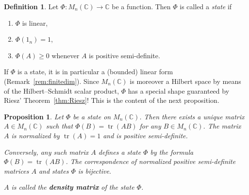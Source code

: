 \documentclass[11pt,a4paper]{article}
\numberwithin{equation}{section}
\newcommand{\C}{\mathbb{C}}
\DeclareMathOperator{\tr}{tr}
\theoremstyle{plain}
\newtheorem{proposition}[theorem]{Proposition}
\theoremstyle{definition}
\newtheorem{definition}[theorem]{Definition}
\theoremstyle{plain}
\theoremstyle{definition}
\begin{document}
\begin{definition}
Let $\Phi:M_n(\C)\to\C$ be a function. Then $\Phi$ is called a \emph{state} if
\begin{enumerate}
\item $\Phi$ is linear,
\item $\Phi(1_n)=1$,
\item $\Phi(A)\geqslant0$ whenever $A$ is positive semi-definite.
\end{enumerate}
\end{definition}

If $\Phi$ is a state, it is in particular a (bounded) linear form (Remark~\ref{rem:finitedim}).
Since $M_n(\C)$ is moreover a Hilbert space by means of the Hilbert--Schmidt scalar product,
$\Phi$ has a special shape guaranteed by Riesz' Theorem~\ref{thm:Riesz}! This is the content
of the next proposition.

\begin{proposition}\label{prop:density}
Let $\Phi$ be a state on $M_n(\C)$. Then there exists a unique matrix $A\in M_n(\C)$ such
that $\Phi(B)=\tr(AB)$ for any $B\in M_n(\C)$. The matrix $A$ is normalized by $\tr(A)=1$
and is positive semi-definite.

Conversely, any such matrix $A$ defines a state $\Phi$ by the formula $\Phi(B)=\tr(AB)$. The
correspondence of normalized positive semi-definite matrices $A$ and states $\Phi$ is bijective.

$A$ is called the \textbf{\emph{density matrix}} of the state $\Phi$.
\end{proposition}
\end{document}
